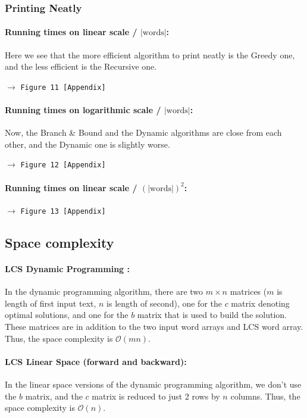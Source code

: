 \documentclass[a4paper,12pt]{article}
\newcommand{\see}[1]{\begin{flushright}$\rightarrow$ \texttt{#1 [Appendix]}\end{flushright}}
\newcommand{\bigO}{\mathcal{O}}
\newcommand{\seeFigure}[1]{\see{Figure #1}}
\begin{document}
			\subsubsection{Printing Neatly}
				\paragraph{Running times on linear scale / $|\text{words}|$:} Here we see that the more efficient algorithm to print neatly is the Greedy one, and the less efficient is the Recursive one.
				\seeFigure{11}
				
				\paragraph{Running times on logarithmic scale / $|\text{words}|$:} Now, the Branch \& Bound and the Dynamic algorithms are close from each other, and the Dynamic one is slightly worse.
				\seeFigure{12}

				\paragraph{Running times on linear scale / $(|\text{words}|)^2$:}
				\seeFigure{13}




		\subsection{Space complexity}
			\paragraph{LCS Dynamic Programming :} In the dynamic programming algorithm, there are two $m \times n$ matrices ($m$ is length of first input text, $n$ is length of second), one for the $c$ matrix denoting optimal solutions, and one for the $b$ matrix that is used to build the solution. These matrices are in addition to the two input word arrays and LCS word array. Thus, the space complexity is $\bigO(mn)$.

			\paragraph{LCS Linear Space (forward and backward):} In the linear space versions of the dynamic programming algorithm, we don't use the $b$ matrix, and the $c$ matrix is reduced to just 2 rows by $n$ columns. Thus, the space complexity is $\bigO(n)$.
\end{document}
